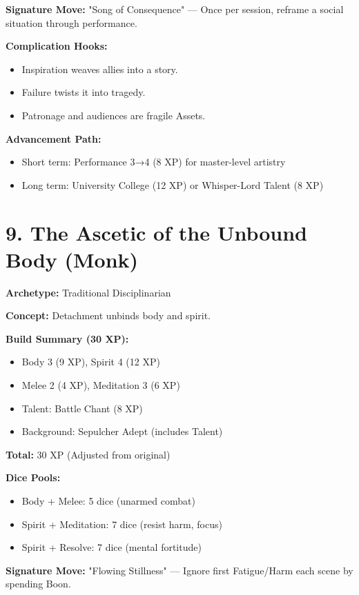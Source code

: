 \textbf{Signature Move:} "Song of Consequence" — Once per session, reframe a social situation through performance.

\textbf{Complication Hooks:}
\begin{itemize}
  \item Inspiration weaves allies into a story.
  \item Failure twists it into tragedy.
  \item Patronage and audiences are fragile Assets.
\end{itemize}

\textbf{Advancement Path:}
\begin{itemize}
  \item Short term: Performance 3→4 (8 XP) for master-level artistry
  \item Long term: University College (12 XP) or Whisper-Lord Talent (8 XP)
\end{itemize}

\section{9. The Ascetic of the Unbound Body (Monk)}
\textbf{Archetype:} Traditional Disciplinarian

\textbf{Concept:} Detachment unbinds body and spirit.

\textbf{Build Summary (30 XP):}
\begin{itemize}
  \item Body 3 (9 XP), Spirit 4 (12 XP)
  \item Melee 2 (4 XP), Meditation 3 (6 XP)
  \item Talent: Battle Chant (8 XP)
  \item Background: Sepulcher Adept (includes Talent)
\end{itemize}
\textbf{Total:} 30 XP (Adjusted from original)

\textbf{Dice Pools:}
\begin{itemize}
  \item Body + Melee: 5 dice (unarmed combat)
  \item Spirit + Meditation: 7 dice (resist harm, focus)
  \item Spirit + Resolve: 7 dice (mental fortitude)
\end{itemize}

\textbf{Signature Move:} "Flowing Stillness" — Ignore first Fatigue/Harm each scene by spending Boon.

